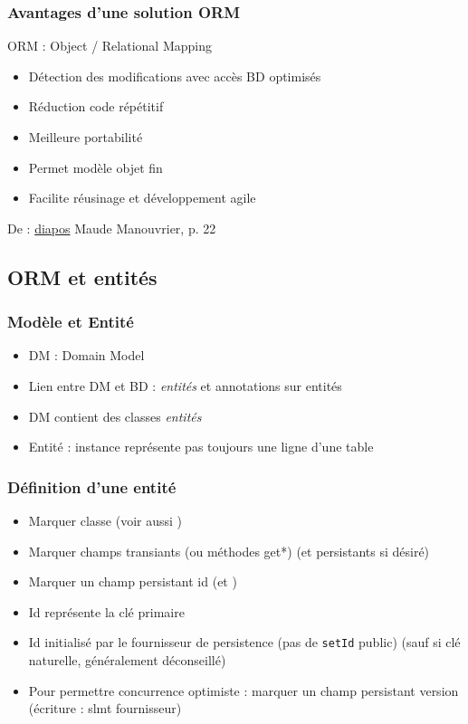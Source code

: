\documentclass[french, english]{beamer}
\begin{document}
\begin{frame}
	\frametitle{Avantages d’une solution ORM}
	ORM : Object / Relational Mapping
	\begin{itemize}
		\item Détection des modifications avec accès BD optimisés
		\item Réduction code répétitif
		\item Meilleure portabilité
		\item Permet modèle objet fin
		\item Facilite réusinage et développement agile
	\end{itemize}
	{\tiny De : \href{http://www.lamsade.dauphine.fr/~manouvri/HIBERNATE/SLIDES/ORM.pdf}{diapos} Maude Manouvrier, p. 22}
\end{frame}

\subsection{ORM et entités}
\begin{frame}
	\frametitle{Modèle et Entité}
	\begin{itemize}
		\item DM : Domain Model
		\item Lien entre DM et BD : \emph{entités} et annotations sur entités
		\item DM contient des classes \emph{entités}
		\item Entité : instance représente {\tiny pas toujours} une ligne d’une table
	\end{itemize}
\end{frame}

\begin{frame}
	\frametitle{Définition d’une entité}
	\begin{itemize}
		\item Marquer classe  {\tiny (voir aussi )}
		\item Marquer champs transiants {\tiny (ou méthodes get*)}  {\tiny (et persistants  si désiré)}
		\item Marquer un champ persistant id  (et )
		\item Id représente la clé primaire
		\item Id initialisé par le fournisseur de persistence (pas de \texttt{setId} public) {\tiny (sauf si clé naturelle, généralement déconseillé)}
		\item Pour permettre concurrence optimiste : marquer un champ persistant version  (écriture : slmt fournisseur)
	\end{itemize}
\end{frame}
\end{document}
